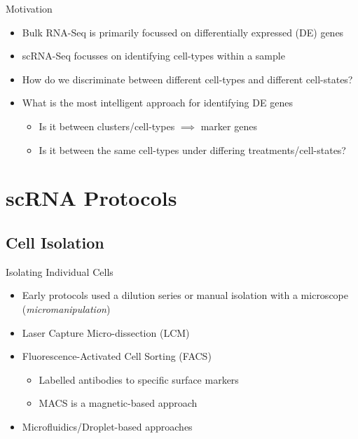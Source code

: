 \documentclass[aspectratio=169,11pt]{beamer}
\begin{document}
\begin{frame}{Motivation}

	\begin{itemize}
		\item Bulk RNA-Seq is primarily focussed on differentially expressed (DE) genes
		\item scRNA-Seq focusses on identifying cell-types within a sample
		\item How do we discriminate between different cell-types and different cell-states?
		\item What is the most intelligent approach for identifying DE genes
		\begin{itemize}
			\item Is it between clusters/cell-types $\implies$ marker genes
			\item Is it between the same cell-types under differing treatments/cell-states?
		\end{itemize}
	\end{itemize}

\end{frame}

\section{scRNA Protocols}

\subsection{Cell Isolation}

\begin{frame}{Isolating Individual Cells}

	\begin{itemize}
		\item Early protocols used a dilution series or manual isolation with a microscope (\textit{micromanipulation})
		\item Laser Capture Micro-dissection (LCM)
		\item Fluorescence-Activated Cell Sorting (FACS)
		\begin{itemize}
			\item Labelled antibodies to specific surface markers 
			\item MACS is a magnetic-based approach
		\end{itemize}
		\item Microfluidics/Droplet-based approaches
	\end{itemize}

\end{frame}
\end{document}
